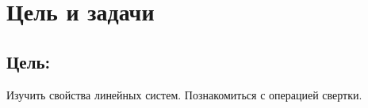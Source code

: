 \chapter*{Цель и задачи}
\label{ch:intro}

\section*{\textbf{Цель:}}

Изучить свойства линейных систем. Познакомиться с операцией свертки.

\endinput